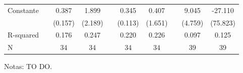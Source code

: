 \begin{table}[h]
{{\begin{threeparttable}
\begin{tabular}{l*{9}{S}}
		Constante            &&       0.387\sym{**} &       1.899         &&       0.345\sym{***}&       0.407         &&       9.045\sym{*}  &     -27.110         \\
		&&     (0.157)         &     (2.189)         &&     (0.113)         &     (1.651)         &&     (4.759)         &    (75.823)         \\
		\midrule                                                                                                   
		R-squared           &&       0.176         &       0.247         &&       0.220         &       0.226         &&       0.097         &       0.125         \\
		N                   &&          34         &          34         &&          34         &          34         &&          39         &          39         \\
		\hline \hline
	\end{tabular}
	\begin{tablenotes}
		\footnotesize{Notas: TO DO.}
	\end{tablenotes}
\end{threeparttable}
}
}
\end{table}

